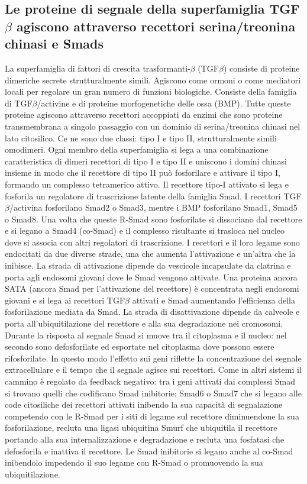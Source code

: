 \subsection{Le proteine di segnale della superfamiglia TGF$\beta$ agiscono attraverso recettori serina/treonina chinasi e Smads}
La superfamiglia di fattori di crescita trasformanti-$\beta$ (TGF$\beta$) consiste di proteine dimeriche secrete strutturalmente simili. Agiscono come ormoni o come mediatori locali per
regolare un gran numero di funzioni biologiche. Consiste della famiglia di TGF$\beta$/activine e di proteine morfogenetiche delle ossa (BMP). Tutte queste proteine agiscono attraverso
recettori accoppiati da enzimi che sono proteine transmembrana a singolo passaggio con un dominio di serina/treonina chinasi nel lato citosilico. Ce ne sono due classi: tipo I e tipo II,
strutturalmente simili omodimeri. Ogni membro della superfamiglia si lega a una combinazione caratteristica di dimeri recettori di tipo I e tipo II e uniscono i domini chinasi insieme
in modo che il recettore di tipo II pu\`o fosforilare e attivare il tipo I, formando un complesso tetramerico attivo. Il recettore tipo-I attivato si lega e fosforila un regolatore
di trascrizione latente della famiglia Smad. I recettori TGF$\beta$/activina fosforilano Smad2 o Smad3, mentre i BMP fosforilano Smad1, Smad5 o Smad8. Una volta che queste R-Smad sono
fosforilate si dissociano dal recettore e si legano a Smad4 (co-Smad) e il complesso risultante si trasloca nel nucleo dove si associa con altri regolatori di trascrizione. I recettori e
il loro legame sono endocitati da due diverse strade, una che aumenta l'attivazione e un'altra che la inibisce. La strada di attivazione dipende da vescicole incapsulate da clatrina e
porta agli endosomi giovani dove le Smad vengono attivate. Una proteina ancora SATA (ancora Smad per l'attivazione del recettore) \`e concentrata negli endosomi giovani e si lega
ai recettori TGF$\beta$ attivati e Smad aumentando l'efficienza della fosforilazione mediata da Smad. La strada di disattivazione dipende da calveole e porta all'ubiquitilazione del
recettore e alla sua degradazione nei cromosomi. Durante la risposta al segnale Smad si muove tra il citoplasma e il nucleo: nel secondo sono defosforilate ed esportate nel 
citoplasma dove possono essere rifosforilate. In questo modo l'effetto sui geni riflette la concentrazione del segnale extracellulare e il tempo che il segnale agisce sui recettori. 
Come in altri sistemi il cammino \`e regolato da feedback negativo: tra i geni attivati dai complessi Smad si trovano quelli che codificano Smad inibitorie: Smad6 o Smad7 che si 
legano alle code citosiliche dei recettori attivati inibendo la sua capacit\`a di segnalazione competendo con le R-Smad per i siti di legame sul recettore diminuendone la sua 
fosforilazione, recluta una ligasi ubiquitina Smurf che ubiquitila il recettore portando alla sua internalizzazione e  degradazione e recluta una fosfatasi che defosforila e inattiva
il recettore. Le Smad inibitorie si legano anche al co-Smad inibendolo impedendo il suo legame con R-Smad o promuovendo la sua ubiquitilazione. 
